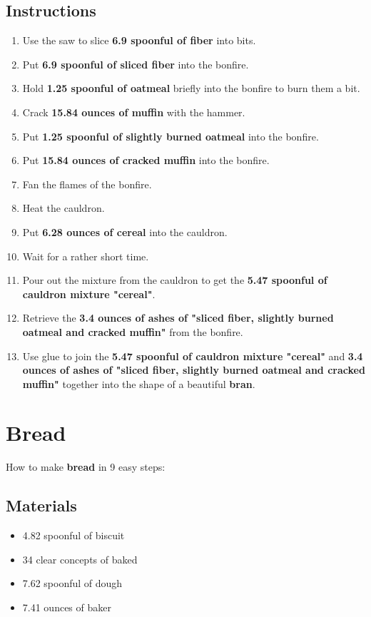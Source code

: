 \documentclass{article}
\begin{document}
\subsection{Instructions}\begin{enumerate}
\item 
Use the saw to slice \textbf{6.9 spoonful of fiber} into bits.
\item 
Put \textbf{6.9 spoonful of sliced fiber} into the bonfire.
\item 
Hold \textbf{1.25 spoonful of oatmeal} briefly into the bonfire to burn them a bit.
\item 
Crack \textbf{15.84 ounces of muffin} with the hammer.
\item 
Put \textbf{1.25 spoonful of slightly burned oatmeal} into the bonfire.
\item 
Put \textbf{15.84 ounces of cracked muffin} into the bonfire.
\item 
Fan the flames of the bonfire.
\item 
Heat the cauldron.
\item 
Put \textbf{6.28 ounces of cereal} into the cauldron.
\item 
Wait for a rather short time.
\item 
Pour out the mixture from the cauldron to get the \textbf{5.47 spoonful of cauldron mixture "cereal"}.
\item 
Retrieve the \textbf{3.4 ounces of ashes of "sliced fiber, slightly burned oatmeal and cracked muffin"} from the bonfire.
\item 
Use glue to join the \textbf{5.47 spoonful of cauldron mixture "cereal"} and \textbf{3.4 ounces of ashes of "sliced fiber, slightly burned oatmeal and cracked muffin"} together into the shape of a beautiful \textbf{bran}.
\end{enumerate}
\newpage
\section{Bread}How to make \textbf{bread} in 9 easy steps:

\subsection{Materials}\begin{itemize}
\item 
4.82 spoonful of biscuit
\item 
34 clear concepts of baked
\item 
7.62 spoonful of dough
\item 
7.41 ounces of baker
\end{itemize}
\end{document}
